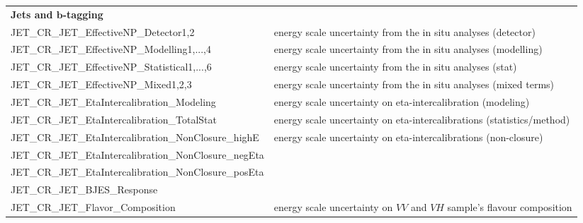 \begin{table}
{\begin{tabular}{ll}
{\bfseries Jets and $\bm{b}$-tagging}\\
JET\_CR\_JET\_EffectiveNP\_Detector1,2 & energy scale uncertainty from the in situ analyses (detector) \\%
JET\_CR\_JET\_EffectiveNP\_Modelling1,...,4 & energy scale uncertainty from the in situ analyses (modelling) \\%
JET\_CR\_JET\_EffectiveNP\_Statistical1,...,6 & energy scale uncertainty from the in situ analyses (stat) \\%
JET\_CR\_JET\_EffectiveNP\_Mixed1,2,3 & energy scale uncertainty from the in situ analyses (mixed terms) \\%
JET\_CR\_JET\_EtaIntercalibration\_Modeling & energy scale uncertainty on eta-intercalibration (modeling)\\%
JET\_CR\_JET\_EtaIntercalibration\_TotalStat & energy scale uncertainty on eta-intercalibrations (statistics/method) \\%
JET\_CR\_JET\_EtaIntercalibration\_NonClosure\_highE & \multirow{3}{*}{energy scale uncertainty on eta-intercalibrations (non-closure)} \\%
JET\_CR\_JET\_EtaIntercalibration\_NonClosure\_negEta &\\%
JET\_CR\_JET\_EtaIntercalibration\_NonClosure\_posEta &\\%
JET\_CR\_JET\_BJES\_Response &  \\%
JET\_CR\_JET\_Flavor\_Composition & energy scale uncertainty on $VV$ and $VH$ sample's flavour composition \\%

\end{tabular}}
\end{table}
